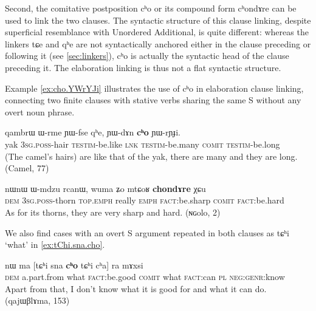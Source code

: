 \documentclass[oldfontcommands,oneside,a4paper,11pt]{article}
\newcommand{\ipa}[1]{{\phon \mbox{#1}}} %
\begin{document}
Second,  the comitative postposition \ipa{cʰo} or its compound form  \ipa{cʰondɤre} can be used to link the two clauses. The syntactic structure of this clause linking, despite superficial resemblance with Unordered Additional, is quite different: whereas the linkers \ipa{tɕe} and \ipa{qʰe} are not syntactically anchored either in the clause preceding or following it (see \ref{sec:linkers}), \ipa{cʰo} is actually the syntactic head of the clause preceding it. The elaboration linking is thus not a flat syntactic structure.



Example \ref{ex:cho.YWrYJi} illustrates the use of \ipa{cʰo} in elaboration clause linking, connecting two finite clauses with stative verbs sharing the same S without any overt noun phrase.

\begin{exe}
\ex \label{ex:cho.YWrYJi}
\gll
\ipa{qambrɯ}  	\ipa{ɯ-rme}  	\ipa{ɲɯ-fse}  	\ipa{qʰe,}  	\ipa{ɲɯ-dɤn}  	\ipa{\textbf{cʰo}}  	\ipa{ɲɯ-rɲɟi.}  \\
yak \textsc{3sg.poss}-hair \textsc{testim}-be.like \textsc{lnk} \textsc{testim}-be.many \textsc{comit} \textsc{testim}-be.long \\
\glt (The camel's hairs) are like that of the yak, there are many and they are long. (Camel, 77)
\end{exe}

\begin{exe}
\ex \label{ex:chondAre}
\gll
\ipa{nɯnɯ}  	\ipa{ɯ-mdzu}  	\ipa{rcanɯ,}  	\ipa{wuma}  	\ipa{ʑo}  	\ipa{mtɕoʁ}  	\ipa{\textbf{chondɤre}}  	\ipa{χɕu}  \\
\textsc{dem} \textsc{3sg.poss}-thorn \textsc{top.emph} really \textsc{emph} \textsc{fact}:be.sharp \textsc{comit} \textsc{fact}:be.hard \\
\glt As for its thorns, they are very sharp and hard. (ɴɢolo, 2)
\end{exe}

We also find cases with an overt S argument repeated in both clauses as \ipa{tɕʰi} `what' in \ref{ex:tChi.sna.cho}.

\begin{exe}
\ex \label{ex:tChi.sna.cho}
\gll
\ipa{nɯ}  	\ipa{ma}  	[\ipa{tɕʰi}  	\ipa{sna}  	\ipa{\textbf{cʰo}}  	\ipa{tɕʰi}  	\ipa{cʰa}]  	\ipa{ra}  	\ipa{mɤxsi}  \\
\textsc{dem} a.part.from what \textsc{fact}:be.good \textsc{comit} what \textsc{fact}:can \textsc{pl} \textsc{neg:genr}:know\\
\glt Apart from that, I don't know what it is good for and what it can do. (qajɯβlɤma, 153)
\end{exe}
\end{document}
